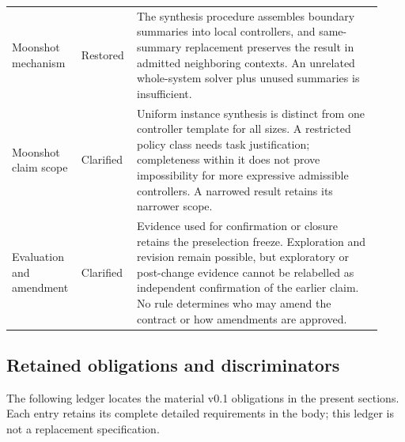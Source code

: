 \documentclass[11pt]{article}
\begin{document}
{\begin{longtable}{@{}P{0.16\linewidth}P{0.13\linewidth}P{0.64\linewidth}@{}}
Moonshot mechanism & Restored & The synthesis procedure assembles boundary summaries into local controllers, and same-summary replacement preserves the result in admitted neighboring contexts. An unrelated whole-system solver plus unused summaries is insufficient. \\
Moonshot claim scope & Clarified & Uniform instance synthesis is distinct from one controller template for all sizes. A restricted policy class needs task justification; completeness within it does not prove impossibility for more expressive admissible controllers. A narrowed result retains its narrower scope. \\
Evaluation and amendment & Clarified & Evidence used for confirmation or closure retains the preselection freeze. Exploration and revision remain possible, but exploratory or post-change evidence cannot be relabelled as independent confirmation of the earlier claim. No rule determines who may amend the contract or how amendments are approved. \\
\bottomrule
\end{longtable}
}

\subsection*{Retained obligations and discriminators}
The following ledger locates the material v0.1 obligations in the present sections. Each entry retains its complete detailed requirements in the body; this ledger is not a replacement specification.
\end{document}

